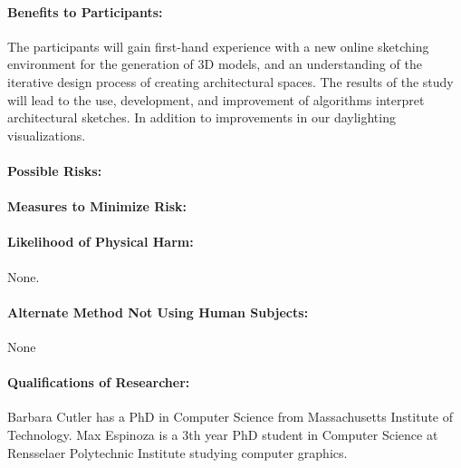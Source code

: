 \documentclass[12pt]{article}
\begin{document}
\paragraph{Benefits to Participants:}
The participants will gain first-hand experience with a new online sketching
environment for the generation of 3D models, and an understanding of the 
iterative design process of creating architectural spaces. The results 
of the study will lead to the use, development, and improvement of algorithms 
interpret architectural sketches. In addition to improvements in our daylighting 
visualizations.

\paragraph{Possible Risks:}   
% 
% 

\paragraph{Measures to Minimize Risk:}
\noindent

\paragraph{Likelihood of Physical Harm:}   None.

\paragraph{Alternate Method Not Using Human Subjects:} None

\paragraph{Qualifications of Researcher:}
Barbara Cutler has a PhD in Computer Science from Massachusetts
Institute of Technology.  Max Espinoza is a 3th year PhD student in
Computer Science at Rensselaer Polytechnic Institute studying computer
graphics.
\end{document}

